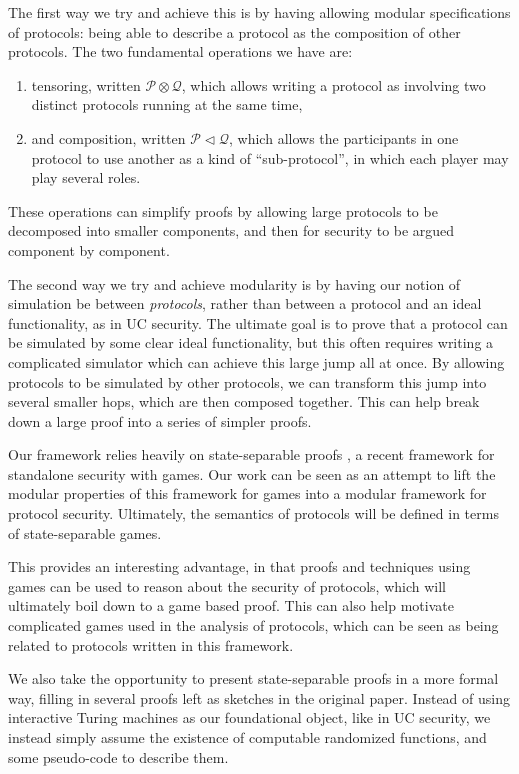 The first way we try and achieve this is by having allowing
modular specifications of protocols: being able to describe a protocol
as the composition of other protocols.
The two fundamental operations we have are:
\begin{enumerate}
\item tensoring, written $\mathscr{P} \otimes \mathscr{Q}$,
which allows writing a protocol as involving two distinct protocols
running at the same time,
\item and composition, written $\mathscr{P} \lhd \mathscr{Q}$,
which allows the participants in one protocol to use another
as a kind of ``sub-protocol'', in which each player may play
several roles.
\end{enumerate}
These operations can simplify proofs by allowing large protocols
to be decomposed into smaller components,
and then for security to be argued component by component.

The second way we try and achieve modularity is by having our
notion of simulation be between \emph{protocols},
rather than between a protocol and an ideal functionality,
as in UC security.
The ultimate goal is to prove that a protocol can be simulated
by some clear ideal functionality,
but this often requires writing a complicated simulator
which can achieve this large jump all at once.
By allowing protocols to be simulated by other protocols,
we can transform this jump into several smaller hops,
which are then composed together.
This can help break down a large proof into a series of simpler proofs.

Our framework relies heavily on state-separable proofs \cite{AC:BDFKK18},
a recent framework for standalone security with games.
Our work can be seen as an attempt to lift the modular
properties of this framework for games into a modular
framework for protocol security.
Ultimately, the semantics of protocols will be defined in terms
of state-separable games.

This provides an interesting advantage, in that proofs
and techniques using games can be used to reason
about the security of protocols, which will ultimately
boil down to a game based proof.
This can also help motivate complicated games used in the analysis
of protocols, which can be seen as being related to protocols
written in this framework.

We also take the opportunity to present state-separable proofs
in a more formal way, filling in several proofs left as sketches
in the original paper.
Instead of using interactive Turing machines as our foundational
object, like in UC security,
we instead simply assume the existence of computable randomized functions,
and some pseudo-code to describe them.

